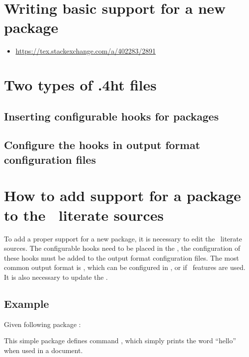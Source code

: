 
\section{Writing basic support for a new package}
\begin{itemize}
  \item \url{https://tex.stackexchange.com/a/402283/2891}
\end{itemize}

\section{Two types of .4ht files}

\subsection{Inserting configurable hooks for packages}

\subsection{Configure the hooks in output format configuration files}

\section{How to add support for a package to the \texfourht\ literate sources}

To add a proper support for a new package, it is necessary to edit the 
\texfourht\ literate sources. The configurable hooks need to be placed in the ,
the configuration of these hooks must be added to the output format configuration files.
The most common output format is \HTML, which can be configured in , or 
 if \HTMLV\ features are used. It is also necessary to update the
.

\subsection{Example}

Given following package :


This simple package defines command \texcommand{\hello}, which simply prints the word \enquote{hello} when used in a document.

